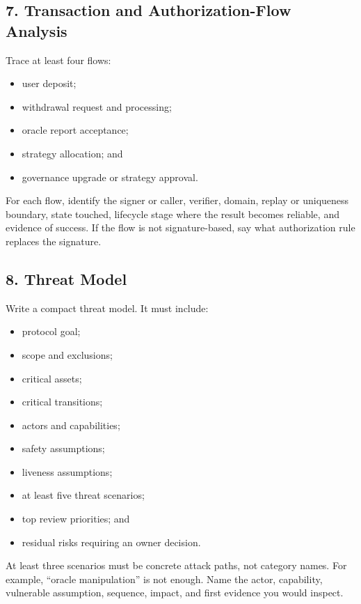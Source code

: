 \subsection*{7. Transaction and Authorization-Flow Analysis}

Trace at least four flows:

\begin{itemize}
\item user deposit;
\item withdrawal request and processing;
\item oracle report acceptance;
\item strategy allocation; and
\item governance upgrade or strategy approval.
\end{itemize}

For each flow, identify the signer or caller, verifier, domain, replay or uniqueness boundary, state touched, lifecycle stage where the result becomes reliable, and evidence of success. If the flow is not signature-based, say what authorization rule replaces the signature.

\subsection*{8. Threat Model}

Write a compact threat model. It must include:

\begin{itemize}
\item protocol goal;
\item scope and exclusions;
\item critical assets;
\item critical transitions;
\item actors and capabilities;
\item safety assumptions;
\item liveness assumptions;
\item at least five threat scenarios;
\item top review priorities; and
\item residual risks requiring an owner decision.
\end{itemize}

At least three scenarios must be concrete attack paths, not category names. For example, ``oracle manipulation'' is not enough. Name the actor, capability, vulnerable assumption, sequence, impact, and first evidence you would inspect.

